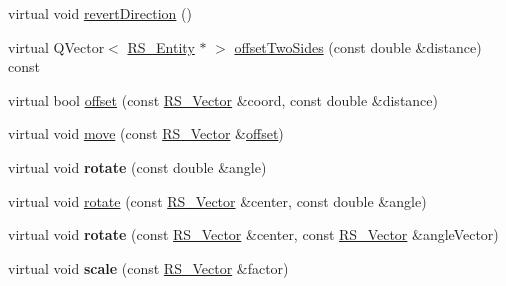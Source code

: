 \begin{DoxyCompactItemize}
\item 
virtual void \hyperlink{classRS__Line_abf3cac30d7756f59f57c7164e4c585e8}{revert\-Direction} ()
\item 
virtual Q\-Vector$<$ \hyperlink{classRS__Entity}{R\-S\-\_\-\-Entity} $\ast$ $>$ \hyperlink{classRS__Line_a3da115926f647a636c64dd9102ddea98}{offset\-Two\-Sides} (const double \&distance) const 
\item 
virtual bool \hyperlink{classRS__Line_a159f62094d2f2cbcbe56b38c60e8b96f}{offset} (const \hyperlink{classRS__Vector}{R\-S\-\_\-\-Vector} \&coord, const double \&distance)
\item 
virtual void \hyperlink{classRS__Line_a03a011b8ba187ed9396d78a8c71f5ff8}{move} (const \hyperlink{classRS__Vector}{R\-S\-\_\-\-Vector} \&\hyperlink{classRS__Line_a159f62094d2f2cbcbe56b38c60e8b96f}{offset})
\item 
\hypertarget{classRS__Line_a61c3a562a16b96a2d11d00f4040b8019}{virtual void {\bfseries rotate} (const double \&angle)}\label{classRS__Line_a61c3a562a16b96a2d11d00f4040b8019}

\item 
virtual void \hyperlink{classRS__Line_ab4cd760a55068333a61e1ceda422cd5d}{rotate} (const \hyperlink{classRS__Vector}{R\-S\-\_\-\-Vector} \&center, const double \&angle)
\item 
\hypertarget{classRS__Line_ab37ba4a3b3d788c69a96b2a3cad9499f}{virtual void {\bfseries rotate} (const \hyperlink{classRS__Vector}{R\-S\-\_\-\-Vector} \&center, const \hyperlink{classRS__Vector}{R\-S\-\_\-\-Vector} \&angle\-Vector)}\label{classRS__Line_ab37ba4a3b3d788c69a96b2a3cad9499f}

\item 
\hypertarget{classRS__Line_ad1c53025cb87233bb31849b87fb9a8ab}{virtual void {\bfseries scale} (const \hyperlink{classRS__Vector}{R\-S\-\_\-\-Vector} \&factor)}\label{classRS__Line_ad1c53025cb87233bb31849b87fb9a8ab}


\end{DoxyCompactItemize}
